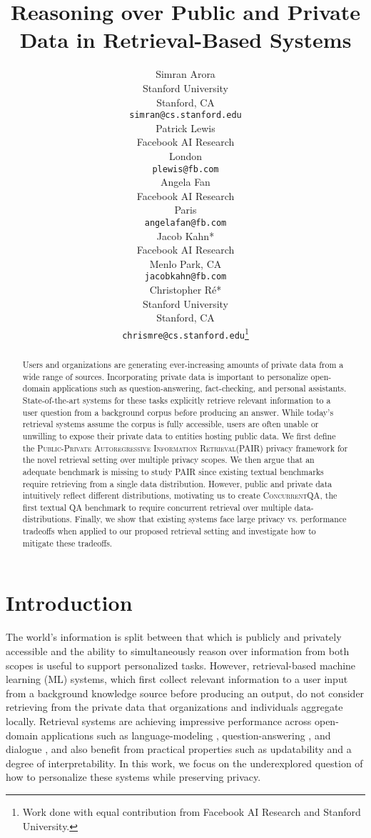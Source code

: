 \documentclass{article}
\title{Reasoning over Public and Private Data in Retrieval-Based Systems}
\author{Simran Arora \\
  Stanford University \\
  Stanford, CA \\
  \texttt{simran@cs.stanford.edu}
  \\\And
  Patrick Lewis \\
  Facebook AI Research \\
  London \\
  \texttt{plewis@fb.com} \\\And
  Angela Fan \\
  Facebook AI Research \\
  Paris \\
  \texttt{angelafan@fb.com} \\\And
  Jacob Kahn* \\
  Facebook AI Research \\
  Menlo Park, CA \\
  \texttt{jacobkahn@fb.com} \\\And
  Christopher Ré* \\
  Stanford University \\
  Stanford, CA \\
  \texttt{chrismre@cs.stanford.edu}\thanks{Work done with equal contribution from Facebook AI Research and Stanford University.} \\
}
\renewcommand\cite{\citep}	\newcommand\shortcite{\citeyearpar}\newcommand\newcite{\citet}
\newcommand{\datasetname}{\textsc{ConcurrentQA}\xspace}
\newcommand{\problemlongname}{\textsc{Public-Private Autoregressive Information Retrieval}\xspace}
\newcommand{\problemshortname}{\textsc{PAIR}\xspace}
\begin{document}
\maketitle
\begin{abstract}
Users and organizations are generating ever-increasing amounts of private data from a wide range of sources. Incorporating private data is important to personalize open-domain applications such as question-answering, fact-checking, and personal assistants. 
State-of-the-art systems for these tasks explicitly retrieve relevant information to a user question from a background corpus before producing an answer. While today's retrieval systems assume the corpus is fully accessible, users are often unable or unwilling to expose their private data to entities hosting public data.
We first define the \problemlongname (\problemshortname) privacy framework for the novel retrieval setting over multiple privacy scopes. We then argue that an adequate benchmark is missing to study \problemshortname since existing textual benchmarks require retrieving from a single data distribution. However, public and private data intuitively reflect different distributions, motivating us to create \datasetname, the first textual QA benchmark to require concurrent retrieval over multiple data-distributions.
Finally, we show that existing systems face large privacy vs. performance tradeoffs when applied to our proposed retrieval setting and investigate how to mitigate these tradeoffs.
\end{abstract}



\section{Introduction}



The world's information is split between that which is publicly and privately accessible and the ability to simultaneously reason over information from both scopes is useful to support personalized tasks. However, retrieval-based machine learning (ML) systems, which first collect relevant information to a user input from a background knowledge source before producing an output, do not consider retrieving from the private data that organizations and individuals aggregate locally. Retrieval systems are achieving impressive performance across open-domain applications such as language-modeling \cite{borgeaud2021retro},  question-answering \cite{voorhees1999trec,chen2017retrieveread}, and dialogue \cite{dinan2019wow}, and also benefit from practical properties such as updatability and a degree of interpretability. In this work, we focus on the underexplored question of how to personalize these systems while preserving privacy.
\end{document}
